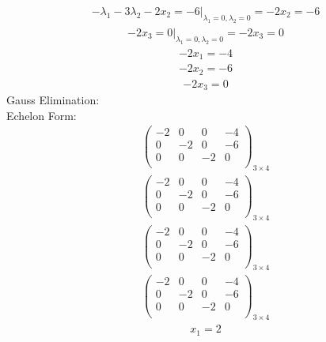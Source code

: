 \documentclass{article}
\begin{document}
\begin{align*}
\left.-\lambda_{1} - 3\lambda_{2} - 2x_{2}=-6\right|_{\lambda_{1}=0,\lambda_{2}=0}=-2x_{2}=-6\end{align*}
\begin{align*}
\left.-2x_{3}=0\right|_{\lambda_{1}=0,\lambda_{2}=0}=-2x_{3}=0\end{align*}
\begin{align*}
-2x_{1}=-4\end{align*}
\begin{align*}
-2x_{2}=-6\end{align*}
\begin{align*}
-2x_{3}=0\end{align*}
Gauss Elimination:\\
Echelon Form:\\
\begin{align*}
\left(
\begin{array}{ccc|c}
-2 & 0 & 0 & -4\\
0 & -2 & 0 & -6\\
0 & 0 & -2 & 0\\
\end{array}
\right)_{3\times 4}
\end{align*}
\begin{align*}
\left(
\begin{array}{ccc|c}
-2 & 0 & 0 & -4\\
0 & -2 & 0 & -6\\
0 & 0 & -2 & 0\\
\end{array}
\right)_{3\times 4}
\end{align*}
\begin{align*}
\left(
\begin{array}{ccc|c}
-2 & 0 & 0 & -4\\
0 & -2 & 0 & -6\\
0 & 0 & -2 & 0\\
\end{array}
\right)_{3\times 4}
\end{align*}
\begin{align*}
\left(
\begin{array}{ccc|c}
-2 & 0 & 0 & -4\\
0 & -2 & 0 & -6\\
0 & 0 & -2 & 0\\
\end{array}
\right)_{3\times 4}
\end{align*}
\begin{align*}
x_{1}=2\end{align*}
\end{document}
